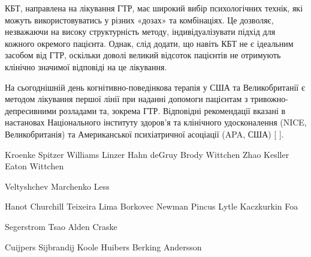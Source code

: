 КБТ, направлена на лікування ГТР, має широкий вибір психологічних технік, які можуть використовуватись у різних «дозах» та комбінаціях. Це дозволяє, незважаючи на високу структурність методу, індивідуалізувати підхід для кожного окремого пацієнта. Однак, слід додати, що навіть КБТ не є ідеальним засобом від ГТР, оскільки доволі великий відсоток пацієнтів не отримують клінічно значимої відповіді на це лікування.

На сьогоднішній день когнітивно-поведінкова терапія у США та Великобританії є методом лікування першої лінії при наданні допомоги пацієнтам з тривожно-депресивними розладами та, зокрема ГТР. Відповідні рекомендації вказані в настановах Національного інституту здоров’я та клінічного удосконалення (NICE, Великобританія) та Американської психіатричної асоціації (APA, США) [
\cite{bib26}].

Kroenke Spitzer Williams Linzer Hahn deGruy Brody 
Wittchen Zhao Kesller Eaton 
Wittchen 




Veltyshchev Marchenko 
Less 






Hanot Churchill Teixeira Lima 
Borkovec Newman Pincus Lytle 
Kaczkurkin Foa 



Segerstrom Tsao Alden Craske 


Cuijpers Sijbrandij Koole Huibers Berking Andersson 

